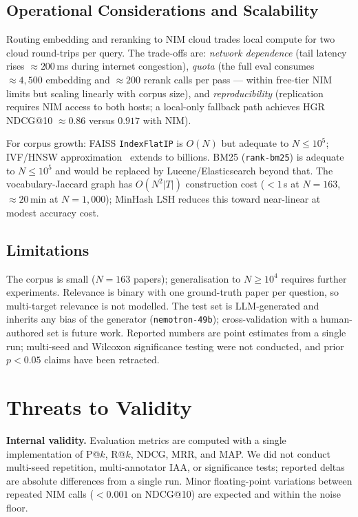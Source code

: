 \documentclass[journal]{IEEEtran}
\begin{document}
\subsection{Operational Considerations and Scalability}
Routing embedding and reranking to NIM cloud trades local compute
for two cloud round-trips per query. The trade-offs are:
\emph{network dependence} (tail latency rises $\approx 200$\,ms
during internet congestion), \emph{quota} (the full eval consumes
$\approx 4{,}500$ embedding and $\approx 200$ rerank calls per
pass — within free-tier NIM limits but scaling linearly with corpus
size), and \emph{reproducibility} (replication requires NIM access
to both hosts; a local-only fallback path achieves HGR NDCG@10
$\approx 0.86$ versus $0.917$ with NIM).

For corpus growth: FAISS \texttt{IndexFlatIP} is $O(N)$ but adequate
to $N\!\leq\!10^5$; IVF/HNSW approximation~\cite{johnson2019faiss}
extends to billions. BM25 (\texttt{rank-bm25}) is adequate to
$N\!\leq\!10^5$ and would be replaced by Lucene/Elasticsearch beyond
that. The vocabulary-Jaccard graph has $O(N^2|T|)$ construction cost
($<1$\,s at $N\!=\!163$, $\approx 20$\,min at $N\!=\!1{,}000$);
MinHash LSH reduces this toward near-linear at modest accuracy cost.

\subsection{Limitations}
The corpus is small ($N=163$ papers); generalisation to $N\!\geq\!10^4$
requires further experiments. Relevance is binary with one ground-truth
paper per question, so multi-target relevance is not modelled. The test
set is LLM-generated and inherits any bias of the generator
(\texttt{nemotron-49b}); cross-validation with a human-authored set is
future work. Reported numbers are point estimates from a single run;
multi-seed and Wilcoxon significance testing were not conducted, and
prior $p<0.05$ claims have been retracted.

\section{Threats to Validity}
\label{sec:threats}

\textbf{Internal validity.} Evaluation metrics are computed with a
single implementation of P@$k$, R@$k$, NDCG, MRR, and MAP. We did not
conduct multi-seed repetition, multi-annotator IAA, or significance
tests; reported deltas are absolute differences from a single run.
Minor floating-point variations between repeated NIM calls
($<0.001$ on NDCG@10) are expected and within the noise floor.
\end{document}
